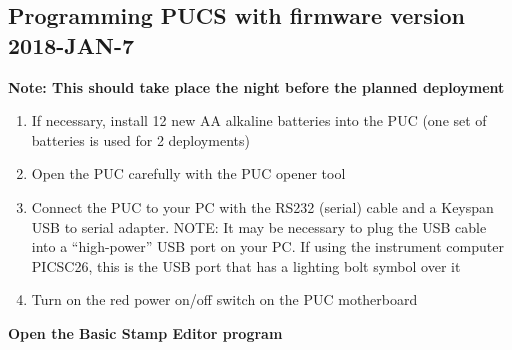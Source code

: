 \documentclass[]{book}
\begin{document}
\subsection{Programming PUCS with firmware version
2018-JAN-7}\label{programming-pucs-with-firmware-version-2018-jan-7}

\textbf{Note: This should take place the night before the planned
deployment}

\begin{enumerate}
\def\labelenumi{\arabic{enumi}.}
\item
  If necessary, install 12 new AA alkaline batteries into the PUC (one
  set of batteries is used for 2 deployments)
\item
  Open the PUC carefully with the PUC opener tool
\item
  Connect the PUC to your PC with the RS232 (serial) cable and a Keyspan
  USB to serial adapter. NOTE: It may be necessary to plug the USB cable
  into a ``high-power'' USB port on your PC. If using the instrument
  computer PICSC26, this is the USB port that has a lighting bolt symbol
  over it
\item
  Turn on the red power on/off switch on the PUC motherboard
\end{enumerate}

\textbf{Open the Basic Stamp Editor program}
\end{document}
